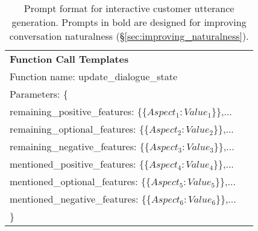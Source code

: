 \begin{table*}[t]
\begin{center}
\begin{tabular}{p{0.95\linewidth} }
    \textbf{Function Call Templates} \\
    Function name: update\_dialogue\_state \\
    Parameters: \{ \\
    \hspace{1cm} remaining\_positive\_features: \{\{\textit{$Aspect_1: Value_1$}\}\},... \\
    \hspace{1cm} remaining\_optional\_features: \{\{\textit{$Aspect_2: Value_2$}\}\},... \\
    \hspace{1cm} remaining\_negative\_features: \{\{\textit{$Aspect_3: Value_3$}\}\},... \\
    \hspace{1cm} mentioned\_positive\_features: \{\{\textit{$Aspect_4: Value_4$}\}\},... \\
    \hspace{1cm} mentioned\_optional\_features: \{\{\textit{$Aspect_5: Value_5$}\}\},... \\
    \hspace{1cm} mentioned\_negative\_features: \{\{\textit{$Aspect_6: Value_6$}\}\},... \\
    \}\\ \hline
    \end{tabular}
    \caption{Prompt format for interactive customer utterance generation. Prompts in bold are designed for improving conversation naturalness (\S\ref{sec:improving_naturalness}). } \label{tab:customer_prompt}
\end{center}
\end{table*}


